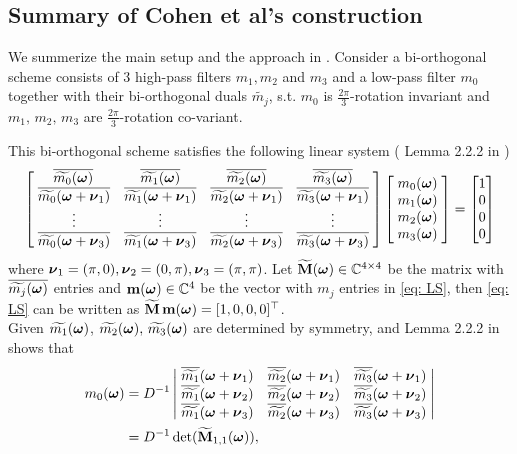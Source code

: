 \subsection{Summary of Cohen et al's construction}\label{subsec: cohen-summary}
We summerize the main setup and the approach in \cite{cohen1993compactly}. Consider a bi-orthogonal scheme consists of 3 high-pass filters $m_1,m_2$ and $m_3$ and a low-pass filter $m_0$ together with their bi-orthogonal duals $\widetilde{m_j}$, s.t.
$m_0$ is $\frac{2\pi}{3}$-rotation invariant and $m_1,\, m_2,\, m_3$ are $\frac{2\pi}{3}$-rotation co-variant.

This bi-orthogonal scheme satisfies the following linear system (
Lemma 2.2.2 in \cite{cohen1993compactly} )
\begin{align}\label{eq: LS}
\begin{bmatrix}
    \,\overline{\widetilde{m_{0}}(\boldsymbol{\omega})} & \overline{\widetilde{m_{1}}(\boldsymbol{\omega})} & \overline{\widetilde{m_{2}}(\boldsymbol{\omega})} & \overline{\widetilde{m_{3}}(\boldsymbol{\omega})}\;  \\
    \;\overline{\widetilde{m_{0}}(\boldsymbol{\omega} + \boldsymbol{\nu}_{1})} & \overline{\widetilde{m_{1}}(\boldsymbol{\omega} + \boldsymbol{\nu}_{1})}  & \overline{\widetilde{m_{2}}(\boldsymbol{\omega} + \boldsymbol{\nu}_{1})}  & \overline{\widetilde{m_{3}}(\boldsymbol{\omega} + \boldsymbol{\nu}_{1})}\; \\
    \;\vdots & \vdots & \vdots & \vdots \; \\
    \;\overline{\widetilde{m_{0}}(\boldsymbol{\omega} + \boldsymbol{\nu}_{3})} & \overline{\widetilde{m_{1}}(\boldsymbol{\omega} + \boldsymbol{\nu}_{3})} & \overline{\widetilde{m_{2}}(\boldsymbol{\omega} + \boldsymbol{\nu}_{3})} & \overline{\widetilde{m_{3}}(\boldsymbol{\omega} + \boldsymbol{\nu}_{3})}\;
\end{bmatrix}
\begin{bmatrix}
\;m_{0}(\boldsymbol{\omega})\; \\
\;m_{1}(\boldsymbol{\omega})\; \\
\;m_{2}(\boldsymbol{\omega})\; \\
\;m_{3}(\boldsymbol{\omega})\; 
\end{bmatrix} 
=
\begin{bmatrix}
1\\
0\\
0\\
0
\end{bmatrix}
\end{align}
 where $\boldsymbol{\nu}_1 = (\pi,0),\boldsymbol{\nu}_2 = (0,\pi),\boldsymbol{\nu}_3=(\pi,\pi)$.
 Let $\widetilde{\mathbf{M}}(\boldsymbol{\omega})\in\mathbb{C}^{4\times 4}$ be the matrix with $\overline{\widetilde{m_{j}}(\boldsymbol{\omega})}$ entries and $\mathbf{m}(\boldsymbol{\omega})\in\mathbb{C}^4$ be the vector with $m_j$ entries in \eqref{eq: LS}, then \eqref{eq: LS} can be written as \(\widetilde{\mathbf{M}}\, \mathbf{m} (\boldsymbol{\omega})= [1,0,0,0]^\top\).\\
Given $\widetilde{m_{1}}(\boldsymbol{\omega})$, $\widetilde{m_{2}}(\boldsymbol{\omega}),\,\widetilde{m_{3}}(\boldsymbol{\omega})$ are determined by symmetry, and Lemma 2.2.2 in \cite{cohen1993compactly} shows that
\begin{align}\label{eq: m0-sol}
m_0(\V{\omega}) &= D^{-1}%
\left|
\begin{matrix}
    \; \sbarmn{1}{1}  & \sbarmn{2}{1}  & \sbarmn{3}{1}\; \\
    \; \sbarmn{1}{2}  & \sbarmn{2}{2}  & \sbarmn{3}{2}\; \\
    \; \sbarmn{1}{3} & \sbarmn{2}{3} & \sbarmn{3}{3}\;
\end{matrix}
\right| \notag\\
&= D^{-1}\det(\widetilde{\mathbf{M}}_{1,1}(\V{\omega})),
\end{align}
